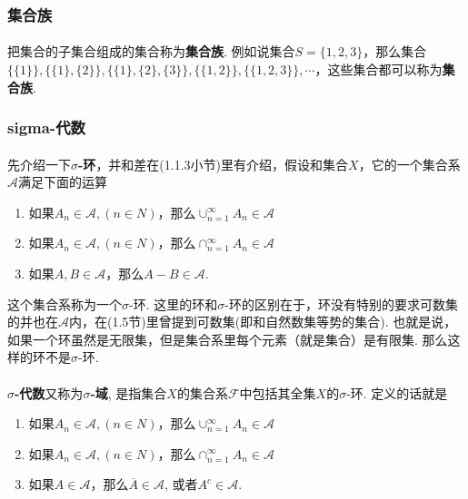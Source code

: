 \subsubsection{集合族}
\paragraph{}
把集合的子集合组成的集合称为\textbf{集合族}. 例如说集合$S = \{1, 2, 3\}$，那么集合$\{\{1\}\}, \{\{1\}, \{2\}\}, \{\{1\}, \{2\}, \{3\}\}, \{\{1, 2\}\}, \{\{1, 2, 3\}\}, \cdots$，这些集合都可以称为\textbf{集合族}.

\subsubsection{sigma-代数}
\paragraph{}
先介绍一下\textbf{$\sigma$-环}，并和差在(1.1.3小节)里有介绍，假设和集合$X$，它的一个集合系$\mathcal{A}$满足下面的运算
\begin{enumerate}
\item 如果$A_n \in \mathcal{A}, (n \in N)$，那么$\cup_{n = 1}^\infty A_n \in \mathcal{A}$
\item 如果$A_n \in \mathcal{A}, (n \in N)$，那么$\cap_{n = 1}^\infty A_n \in \mathcal{A}$
\item 如果$A, B \in \mathcal{A}$，那么$A - B \in \mathcal{A}$.
\end{enumerate}
这个集合系称为一个$\sigma$-环.  这里的环和$\sigma$-环的区别在于，环没有特别的要求可数集的并也在$\mathcal{A}$内，在(1.5节)里曾提到可数集(即和自然数集等势的集合).  也就是说，如果一个环虽然是无限集，但是集合系里每个元素（就是集合）是有限集. 那么这样的环不是$\sigma$-环.

\paragraph{}
\textbf{$\sigma$-代数}又称为\textbf{$\sigma$-域}, 是指集合$X$的集合系$\mathcal{F}$中包括其全集$X$的$\sigma$-环. 定义的话就是
\begin{enumerate}
\item 如果$A_n \in \mathcal{A}, (n \in N)$，那么$\cup_{n = 1}^\infty A_n \in \mathcal{A}$
\item 如果$A_n \in \mathcal{A}, (n \in N)$，那么$\cap_{n = 1}^\infty A_n \in \mathcal{A}$
\item 如果$A \in \mathcal{A}$，那么$\overline{A} \in \mathcal{A}$, 或者$A^c \in \mathcal{A}$.
\end{enumerate}

